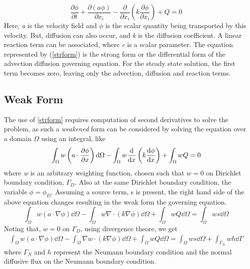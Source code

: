 \documentclass[12pt, oneside]{article}
\begin{document}
    \begin{equation}\label{strform}
	\frac{\partial\phi}{\partial t} + \frac{\partial{(a\phi)}}{\partial{x_i}} - \frac{\partial}{\partial{x_i}} \left( k \frac{\partial\phi}{\partial{x_i}}\right) + Q = 0
   \end{equation}
Here, \textit{a} is the velocity field and $\phi$ is the scalar quantity being transported by this velocity. But, diffusion can also occur, and \textit{k} is the diffusion coefficient. A linear reaction term can be associated, where \textit{c} is a scalar parameter. The equation represented by (\ref{strform}) is the strong form or the differential form of the advection diffusion governing equation. For the steady state solution, the first term becomes zero, leaving only the advection, diffusion and reaction terms.

\subsection{Weak Form}
The use of \ref{strform} requires computation of second derivatives to solve the problem, as such a \textit{weakened} form can be considered by solving the equation over a domain $\Omega$ using an integral, like
\begin{equation}
    \int_{\Omega}w \left( a\cdot \frac{\partial\phi}{\partial x} \right) \dd \Omega - \int_\Omega w \dv{x}\left( k\dv{\phi}{x} \right) + \int_\Omega w Q = 0
\end{equation}
where \textit{w} is an arbitrary weighting function, chosen such that $w=0$ on Dirichlet boundary condition, $\Gamma_D$. Also at the same Dirichlet boundary condition, the variable $\phi = \phi_D$. Assuming a source term, s is present, the right hand side of the above equation changes resulting in the weak form the governing equation.
\begin{equation}
    \int_{\Omega}w \left( a\cdot \nabla\phi \right) \dd \Omega - \int_\Omega w \nabla\cdot\left( k\nabla\phi \right) \dd\Omega + \int_\Omega w Q \dd\Omega = \int_\Omega w s \dd{\Omega}
\end{equation}
Noting that, $w = 0$ on $\Gamma_D$, using divergence theore, we get 
\begin{equation} \label{weakform}
    \begin{aligned}
	\int_{\Omega}w \left( a\cdot \nabla\phi \right) \dd \Omega - \int_\Omega  \nabla w\cdot\left( k\nabla\phi \right) \dd\Omega + \int_\Omega w Q \dd\Omega = \int_\Omega w s \dd{\Omega} + \int_{\Gamma_N} w h \dd{\Gamma} 
    \end{aligned}
\end{equation}
where $\Gamma_N$ and $h$ represent the Neumann boundary condition and the normal diffusive flux on the Neumann boundary condition.
\end{document}
